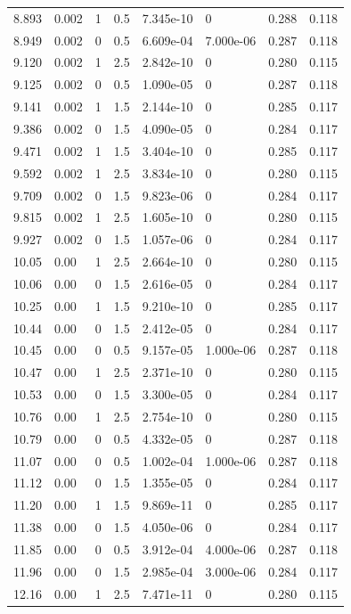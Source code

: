 \documentclass[preview]{standalone}
\begin{document}
{{{\begin{tabular}{L{1.2cm}C{1.2cm} C{0.3cm}C{0.5cm} C{1.4cm}C{1.4cm} C{1.4cm}C{1.4cm}}
  8.893  &  0.002  & 1     & 0.5 &  7.345e-10  & 0  & 0.288 &  0.118   \\ 
  8.949  &  0.002  & 0     & 0.5 &  6.609e-04  & 7.000e-06  & 0.287 &  0.118   \\ 
  9.120  &  0.002  & 1     & 2.5 &  2.842e-10  & 0  & 0.280 &  0.115   \\ 
  9.125  &  0.002  & 0     & 0.5 &  1.090e-05  & 0  & 0.287 &  0.118   \\ 
  9.141  &  0.002  & 1     & 1.5 &  2.144e-10  & 0  & 0.285 &  0.117   \\ 
  9.386  &  0.002  & 0     & 1.5 &  4.090e-05  & 0  & 0.284 &  0.117   \\ 
  9.471  &  0.002  & 1     & 1.5 &  3.404e-10  & 0  & 0.285 &  0.117   \\ 
  9.592  &  0.002  & 1     & 2.5 &  3.834e-10  & 0  & 0.280 &  0.115   \\ 
  9.709  &  0.002  & 0     & 1.5 &  9.823e-06  & 0  & 0.284 &  0.117   \\ 
  9.815  &  0.002  & 1     & 2.5 &  1.605e-10  & 0  & 0.280 &  0.115   \\ 
  9.927  &  0.002  & 0     & 1.5 &  1.057e-06  & 0  & 0.284 &  0.117   \\ 
  10.05  &  0.00  & 1     & 2.5 &  2.664e-10  & 0  & 0.280 &  0.115   \\ 
  10.06  &  0.00  & 0     & 1.5 &  2.616e-05  & 0  & 0.284 &  0.117   \\ 
  10.25  &  0.00  & 1     & 1.5 &  9.210e-10  & 0  & 0.285 &  0.117   \\ 
  10.44  &  0.00  & 0     & 1.5 &  2.412e-05  & 0  & 0.284 &  0.117   \\ 
  10.45  &  0.00  & 0     & 0.5 &  9.157e-05  & 1.000e-06  & 0.287 &  0.118   \\ 
  10.47  &  0.00  & 1     & 2.5 &  2.371e-10  & 0  & 0.280 &  0.115   \\ 
  10.53  &  0.00  & 0     & 1.5 &  3.300e-05  & 0  & 0.284 &  0.117   \\ 
  10.76  &  0.00  & 1     & 2.5 &  2.754e-10  & 0  & 0.280 &  0.115   \\ 
  10.79  &  0.00  & 0     & 0.5 &  4.332e-05  & 0  & 0.287 &  0.118   \\ 
  11.07  &  0.00  & 0     & 0.5 &  1.002e-04  & 1.000e-06  & 0.287 &  0.118   \\ 
  11.12  &  0.00  & 0     & 1.5 &  1.355e-05  & 0  & 0.284 &  0.117   \\ 
  11.20  &  0.00  & 1     & 1.5 &  9.869e-11  & 0  & 0.285 &  0.117   \\ 
  11.38  &  0.00  & 0     & 1.5 &  4.050e-06  & 0  & 0.284 &  0.117   \\ 
  11.85  &  0.00  & 0     & 0.5 &  3.912e-04  & 4.000e-06  & 0.287 &  0.118   \\ 
  11.96  &  0.00  & 0     & 1.5 &  2.985e-04  & 3.000e-06  & 0.284 &  0.117   \\ 
  12.16  &  0.00  & 1     & 2.5 &  7.471e-11  & 0  & 0.280 &  0.115   \\ 
\hline 
\end{tabular} 

}}}
\end{document}
